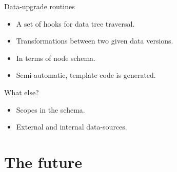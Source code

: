 \documentclass[handout]{beamer}
\begin{document}

\begin{frame}{Data-upgrade routines}

\begin{itemize}
\item A set of hooks for data tree traversal.
\item Transformations between two given data versions.
\item In terms of node schema.
\item Semi-automatic, template code is generated.
\end{itemize}

\end{frame}


\begin{frame}{What else?}

\begin{itemize}
\item Scopes in the schema.
\item External and internal data-sources.
\end{itemize}

\end{frame}


\section{The future}
\end{document}
